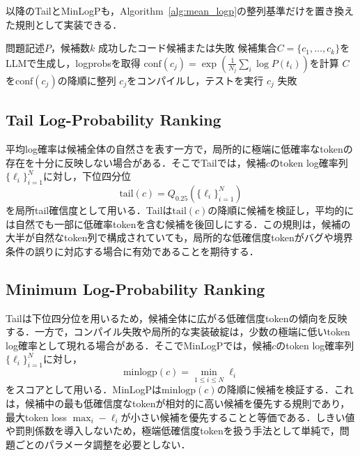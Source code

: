 \documentclass[submit,techrep,noauthor]{ipsj}
\begin{document}
以降のTailとMinLogPも，Algorithm~\ref{alg:mean_logp}の整列基準だけを置き換えた規則として実装できる．

\begin{algorithm}[t]
\caption{Mean Log-Probability Ranking}
\label{alg:mean_logp}
\begin{algorithmic}[1]
\REQUIRE 問題記述$P$，候補数$k$
\ENSURE 成功したコード候補または失敗
\STATE 候補集合$C=\{c_1,\ldots,c_k\}$をLLMで生成し，logprobsを取得
    \STATE $\text{conf}(c_j)=\exp(\frac{1}{N_j}\sum_i \log P(t_i))$を計算
\ENDFOR
\STATE $C$を$\text{conf}(c_j)$の降順に整列
    \STATE $c_j$をコンパイルし，テストを実行
        \RETURN $c_j$
    \ENDIF
\ENDFOR
\RETURN 失敗
\end{algorithmic}
\end{algorithm}

\subsection{Tail Log-Probability Ranking}

平均log確率は候補全体の自然さを表す一方で，局所的に極端に低確率なtokenの存在を十分に反映しない場合がある．そこでTailでは，候補$c$のtoken log確率列$\{\ell_i\}_{i=1}^{N}$に対し，下位四分位
\begin{equation}
\text{tail}(c) = Q_{0.25}(\{\ell_i\}_{i=1}^{N})
\end{equation}
を局所tail確信度として用いる．Tailは$\text{tail}(c)$の降順に候補を検証し，平均的には自然でも一部に低確率tokenを含む候補を後回しにする．この規則は，候補の大半が自然なtoken列で構成されていても，局所的な低確信度tokenがバグや境界条件の誤りに対応する場合に有効であることを期待する．

\subsection{Minimum Log-Probability Ranking}

Tailは下位四分位を用いるため，候補全体に広がる低確信度tokenの傾向を反映する．一方で，コンパイル失敗や局所的な実装破綻は，少数の極端に低いtoken log確率として現れる場合がある．そこでMinLogPでは，候補$c$のtoken log確率列$\{\ell_i\}_{i=1}^{N}$に対し，
\begin{equation}
\text{minlogp}(c) = \min_{1 \leq i \leq N} \ell_i
\end{equation}
をスコアとして用いる．MinLogPは$\text{minlogp}(c)$の降順に候補を検証する．これは，候補中の最も低確信度なtokenが相対的に高い候補を優先する規則であり，最大token loss $\max_i -\ell_i$が小さい候補を優先することと等価である．しきい値や罰則係数を導入しないため，極端低確信度tokenを扱う手法として単純で，問題ごとのパラメータ調整を必要としない．
\end{document}
